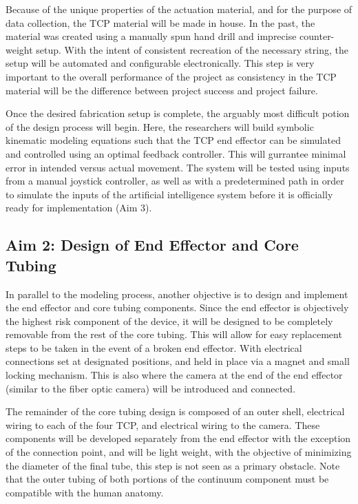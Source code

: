		Because of the unique properties of the actuation material, and for the purpose of data collection, the TCP material will be made in house. In the past, the material was created using a manually spun hand drill and imprecise counter-weight setup. With the intent of consistent recreation of the necessary string, the setup will be automated and configurable electronically. This step is very important to the overall performance of the project as consistency in the TCP material will be the difference between project success and project failure.
	
		Once the desired fabrication setup is complete, the arguably most difficult potion of the design process will begin. Here, the researchers will build symbolic kinematic modeling equations such that the TCP end effector can be simulated and controlled using an optimal feedback controller. This will gurrantee minimal error in intended versus actual movement. The system will be tested using inputs from a manual joystick controller, as well as with a predetermined path in order to simulate the inputs of the artificial intelligence system before it is officially ready for implementation (Aim 3).
	
	\subsection{Aim 2: Design of End Effector and Core Tubing}
	\label{subsect:aim2}
	
		In parallel to the modeling process, another objective is to design and implement the end effector and core tubing components. Since the end effector is objectively the highest risk component of the device, it will be designed to be completely removable from the rest of the core tubing. This will allow for easy replacement steps to be taken in the event of a broken end effector. With electrical connections set at designated positions, and held in place via a magnet and small locking mechanism.	 This is also where the camera at the end of the end effector (similar to the fiber optic camera) will be introduced and connected.
	
		The remainder of the core tubing design is composed of an outer shell, electrical wiring to each of the four TCP, and electrical wiring to the camera. These components will be developed separately from the end effector with the exception of the connection point, and will be light weight, with the objective of minimizing the diameter of the final tube, this step is not seen as a primary obstacle. Note that the outer tubing of both portions of the continuum component must be compatible with the human anatomy.
	
